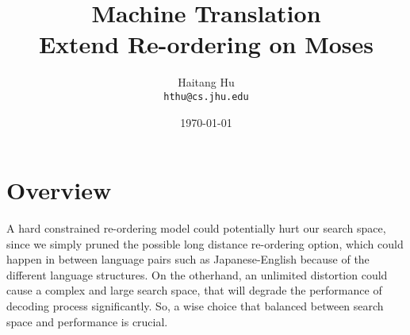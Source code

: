 \documentclass[11pt]{article}
\title{Machine Translation\\Extend Re-ordering on Moses}
\author{Haitang Hu \\
  {\tt hthu@cs.jhu.edu}}
\date{\today}
\begin{document}
\large
\maketitle
\thispagestyle{headings}

\section{Overview} %
\label{sec:Overview}
A hard constrained re-ordering model could potentially hurt our search space, since we simply pruned the possible long distance re-ordering option, which could happen in between language pairs such as Japanese-English because of the different language structures. On the otherhand, an unlimited distortion could cause a complex and large search space, that will degrade the performance of decoding process significantly. So, a wise choice that balanced between search space and performance is crucial. 
\end{document}
